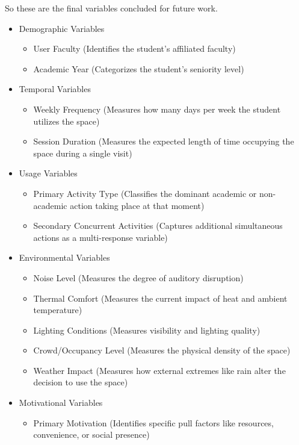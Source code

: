 \documentclass[12pt, a4paper]{report}
\begin{document}
So these are the final variables concluded for future work.

\begin{itemize}
\item Demographic Variables
    \begin{itemize}
        \item User Faculty (Identifies the student's affiliated faculty)
        \item Academic Year (Categorizes the student's seniority level)
    \end{itemize}
\item Temporal Variables
    \begin{itemize}
        \item Weekly Frequency (Measures how many days per week the student utilizes the space)
        \item Session Duration (Measures the expected length of time occupying the space during a single visit)
    \end{itemize}
\item Usage Variables
    \begin{itemize}
        \item Primary Activity Type (Classifies the dominant academic or non-academic action taking place at that moment)
        \item Secondary Concurrent Activities (Captures additional simultaneous actions as a multi-response variable)
    \end{itemize}
\item Environmental Variables
    \begin{itemize}
        \item Noise Level (Measures the degree of auditory disruption)
        \item Thermal Comfort (Measures the current impact of heat and ambient temperature)
        \item Lighting Conditions (Measures visibility and lighting quality)
        \item Crowd/Occupancy Level (Measures the physical density of the space)
        \item Weather Impact (Measures how external extremes like rain alter the decision to use the space)
    \end{itemize}
\item Motivational Variables
    \begin{itemize}
        \item Primary Motivation (Identifies specific pull factors like resources, convenience, or social presence)

\end{itemize}
\end{itemize}
\end{document}

